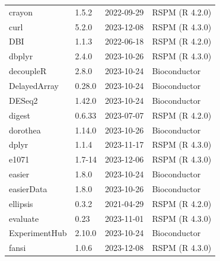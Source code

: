 \documentclass[graybox]{svmult}
\begin{document}
\begin{tabular}{llll}
crayon & 1.5.2 & 2022-09-29 & RSPM (R 4.2.0)\\
curl & 5.2.0 & 2023-12-08 & RSPM (R 4.3.0)\\
\addlinespace
DBI & 1.1.3 & 2022-06-18 & RSPM (R 4.2.0)\\
dbplyr & 2.4.0 & 2023-10-26 & RSPM (R 4.3.0)\\
decoupleR & 2.8.0 & 2023-10-24 & Bioconductor\\
DelayedArray & 0.28.0 & 2023-10-24 & Bioconductor\\
DESeq2 & 1.42.0 & 2023-10-24 & Bioconductor\\
\addlinespace
digest & 0.6.33 & 2023-07-07 & RSPM (R 4.2.0)\\
dorothea & 1.14.0 & 2023-10-26 & Bioconductor\\
dplyr & 1.1.4 & 2023-11-17 & RSPM (R 4.3.0)\\
e1071 & 1.7-14 & 2023-12-06 & RSPM (R 4.3.0)\\
easier & 1.8.0 & 2023-10-24 & Bioconductor\\
\addlinespace
easierData & 1.8.0 & 2023-10-26 & Bioconductor\\
ellipsis & 0.3.2 & 2021-04-29 & RSPM (R 4.2.0)\\
evaluate & 0.23 & 2023-11-01 & RSPM (R 4.3.0)\\
ExperimentHub & 2.10.0 & 2023-10-24 & Bioconductor\\
fansi & 1.0.6 & 2023-12-08 & RSPM (R 4.3.0)\\
\end{tabular}
\pagebreak
\end{document}
